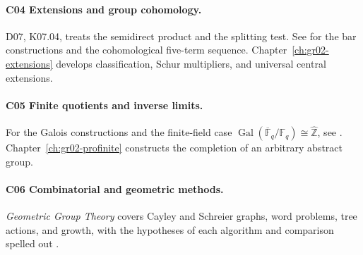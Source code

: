 \paragraph{C04 \enspace Extensions and group cohomology.}
D07, K07.04, treats the semidirect product and the splitting test.
See \cite[Results A02--A03, A05, and A10]{homalg} for the bar
constructions and the cohomological five-term sequence.
Chapter~\ref{ch:gr02-extensions} develops classification,
Schur multipliers, and universal central extensions.

\paragraph{C05 \enspace Finite quotients and inverse limits.}
For the Galois constructions and the finite-field case
\(\operatorname{Gal}(\overline{\mathbb F}_q/\mathbb F_q)
\cong\widehat{\mathbb Z}\), see \cite[Results T04--T06 and E06]{field}.
Chapter~\ref{ch:gr02-profinite} constructs the completion of an
arbitrary abstract group.

\paragraph{C06 \enspace Combinatorial and geometric methods.}
\emph{Geometric Group Theory} covers Cayley and Schreier graphs, word
problems, tree actions, and growth, with the hypotheses of each
algorithm and comparison spelled out \cite[Chs.~1--3 and~6]{geomgroup}.
